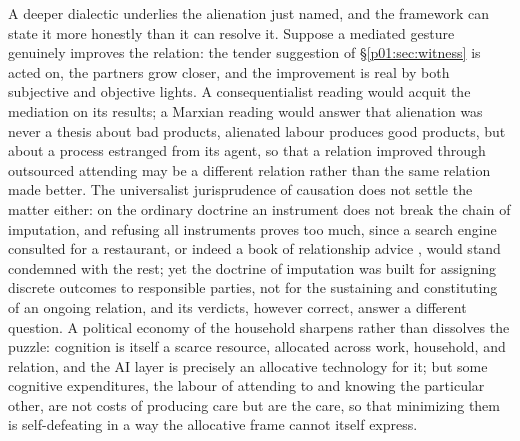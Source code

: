 \documentclass[11pt,a4paper]{article}
\begin{document}
A deeper dialectic underlies the alienation just named, and the framework can state it more honestly than it can resolve it. Suppose a mediated gesture genuinely improves the relation: the tender suggestion of §\ref{p01:sec:witness} is acted on, the partners grow closer, and the improvement is real by both subjective and objective lights. A consequentialist reading would acquit the mediation on its results; a Marxian reading would answer that alienation was never a thesis about bad products, alienated labour produces good products, but about a process estranged from its agent, so that a relation improved through outsourced attending may be a different relation rather than the same relation made better. The universalist jurisprudence of causation does not settle the matter either: on the ordinary doctrine an instrument does not break the chain of imputation, and refusing all instruments proves too much, since a search engine consulted for a restaurant, or indeed a book of relationship advice \parencite{chapman1992five}, would stand condemned with the rest; yet the doctrine of imputation was built for assigning discrete outcomes to responsible parties, not for the sustaining and constituting of an ongoing relation, and its verdicts, however correct, answer a different question. A political economy of the household sharpens rather than dissolves the puzzle: cognition is itself a scarce resource, allocated across work, household, and relation, and the AI layer is precisely an allocative technology for it; but some cognitive expenditures, the labour of attending to and knowing the particular other, are not costs of producing care but are the care, so that minimizing them is self-defeating in a way the allocative frame cannot itself express.
\end{document}
